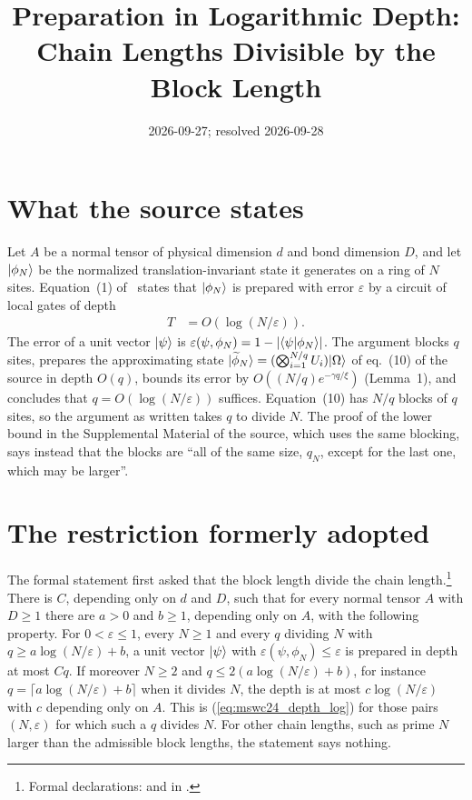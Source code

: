 \documentclass{article}
\title{Preparation in Logarithmic Depth: Chain Lengths Divisible by the Block Length}
\author{}
\date{2026-09-27; resolved 2026-09-28}
\begin{document}
\maketitle
{}

\section{What the source states}
Let $A$ be a normal tensor of physical dimension $d$ and bond dimension $D$, and
let $|\phi_N\rangle$ be the normalized translation-invariant state it generates on
a ring of $N$ sites. Equation~(1) of~\cite{Malz2024Preparation} states that
$|\phi_N\rangle$ is prepared with error $\varepsilon$ by a circuit of local gates
of depth
\begin{align}
    T
     & =O(\log(N/\varepsilon)).
    \label{eq:mswc24_depth_log}
\end{align}
The error of a unit vector $|\psi\rangle$ is
$\varepsilon(\psi,\phi_N)=1-\lvert\langle \psi | \phi_N \rangle\rvert$. The argument
blocks $q$ sites, prepares the approximating state
$|\widetilde\phi_N\rangle=(\bigotimes_{i=1}^{N/q}U_i)|\Omega\rangle$ of eq.~(10) of
the source in depth $O(q)$, bounds its error by
$O((N/q)e^{-\gamma q/\xi})$ (Lemma~1), and concludes that
$q=O(\log(N/\varepsilon))$ suffices. Equation~(10) has $N/q$ blocks of $q$
sites, so the argument as written takes $q$ to divide $N$. The proof of the
lower bound in the Supplemental Material of the source, which uses the same
blocking, says instead that the blocks are ``all of the same size, $q_N$,
except for the last one, which may be larger''.

\section{The restriction formerly adopted}
The formal statement first asked that the block length divide the chain
length.\footnote{Formal declarations:
     and
     in
    .}
There is $C$, depending only on $d$ and $D$, such that for every normal tensor
$A$ with $D\geq1$ there are $a>0$ and $b\geq1$, depending only on $A$, with the
following property. For $0<\varepsilon\leq1$, every $N\geq1$ and every $q$
dividing $N$ with
$q\geq a\log(N/\varepsilon)+b$, a unit vector $|\psi\rangle$ with
$\varepsilon(\psi,\phi_N)\leq\varepsilon$ is prepared in depth at most $Cq$. If
moreover $N\geq2$ and $q\leq2(a\log(N/\varepsilon)+b)$, for instance
$q=\lceil a\log(N/\varepsilon)+b\rceil$ when it divides $N$, the depth is at most
$c\log(N/\varepsilon)$ with $c$ depending only on $A$. This is
(\ref{eq:mswc24_depth_log}) for those pairs $(N,\varepsilon)$ for which such a
$q$ divides $N$. For other chain lengths, such as prime $N$ larger than the
admissible block lengths, the statement says nothing.
\end{document}
